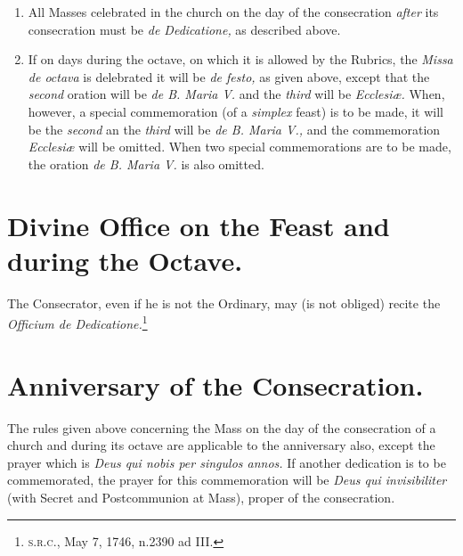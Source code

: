 \documentclass[letterpaper]{report}
\newcommand\src{\textsc{s.r.c.}}
\begin{document}
{\begin{enumerate}
    \item All Masses celebrated in the church on the day of the consecration
        \textit{after} its consecration must be \textit{de Dedicatione,} as
        described above.

    \item If on days during the octave, on which it is allowed by the Rubrics,
        the \textit{Missa de octava} is delebrated it will be \textit{de
        festo,} as given above, except that the \textit{second} oration will be
        \textit{de B. Maria V.} and the \textit{third} will be
        \textit{Ecclesi\ae.} When, however, a special commemoration (of a
        \textit{simplex} feast) is to be made, it will be the \textit{second}
        an the \textit{third} will be \textit{de B. Maria V.,} and the
        commemoration \textit{Ecclesi\ae} will be omitted. When two special
        commemorations are to be made, the oration \textit{de B. Maria V.} is
        also omitted.

\end{enumerate}

\section{Divine Office on the Feast and during the Octave.}

\rubric The Consecrator, even if he is not the Ordinary, may (is not obliged)
recite the \textit{Officium de Dedicatione.}\footnote{\src, May 7, 1746,
n.2390 ad III.}

\section{Anniversary of the Consecration.}

\rubric The rules given above concerning the Mass on the day of the
consecration of a church and during its octave are applicable to the
anniversary also, except the prayer which is \textit{Deus qui nobis per
singulos annos.} If another dedication is to be commemorated, the prayer for
this commemoration will be \textit{Deus qui invisibiliter} (with Secret and
Postcommunion at Mass), proper of the consecration.

}

\printbibliography
    
\end{document}
